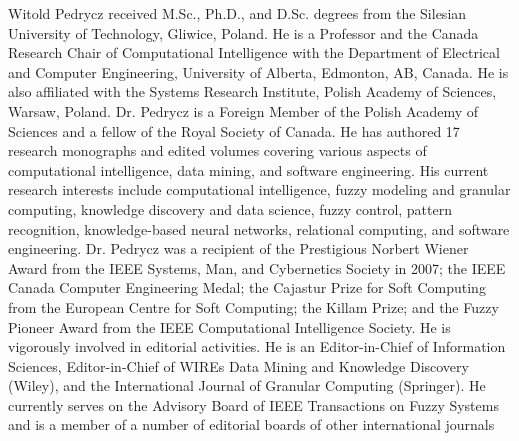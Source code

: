 \documentclass[journal]{IEEEtran}
\begin{document}
\begin{IEEEbiography}{Witold Pedrycz}
received M.Sc., Ph.D., and
D.Sc. degrees from the Silesian University of Technology, Gliwice, Poland.
He is a Professor and the Canada Research Chair
of Computational Intelligence with the Department
of Electrical and Computer Engineering, University
of Alberta, Edmonton, AB, Canada. He is also affiliated with
the Systems Research Institute, Polish Academy of
Sciences, Warsaw, Poland. Dr. Pedrycz is a Foreign
Member of the Polish Academy of Sciences and
a fellow of the Royal Society of Canada. He has
authored 17 research monographs and edited volumes covering various aspects
of computational intelligence, data mining, and software engineering. His
current research interests include computational intelligence, fuzzy modeling
and granular computing, knowledge discovery and data science, fuzzy control,
pattern recognition, knowledge-based neural networks, relational computing,
and software engineering.
Dr. Pedrycz was a recipient of the Prestigious Norbert Wiener Award from
the IEEE Systems, Man, and Cybernetics Society in 2007; the IEEE Canada
Computer Engineering Medal; the Cajastur Prize for Soft Computing from the
European Centre for Soft Computing; the Killam Prize; and the Fuzzy Pioneer
Award from the IEEE Computational Intelligence Society. He is vigorously
involved in editorial activities. He is an Editor-in-Chief of Information
Sciences, Editor-in-Chief of WIREs Data Mining and Knowledge Discovery
(Wiley), and the International Journal of Granular Computing (Springer). He
currently serves on the Advisory Board of IEEE Transactions on Fuzzy
Systems and is a member of a number of editorial boards of other international
journals
\end{IEEEbiography}
\end{document}
